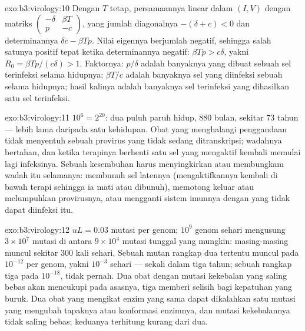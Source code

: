 \begin{solution}{exo:b3:virology:10}
Dengan $T$ tetap, persamaannya linear dalam $(I, V)$ dengan matriks
$\begin{pmatrix} -\delta & \beta T \\ p & -c \end{pmatrix}$, yang jumlah
diagonalnya $-(\delta + c) < 0$ dan determinannya $\delta c - \beta Tp$. Nilai
eigennya berjumlah negatif, sehingga salah satunya positif tepat ketika
determinannya negatif: $\beta Tp > c\delta$, yakni $R_{0} = \beta
Tp/(c\delta) > 1$. Faktornya: $p/\delta$ adalah banyaknya  yang dibuat
sebuah sel terinfeksi selama hidupnya; $\beta T/c$ adalah banyaknya sel yang
diinfeksi sebuah  selama hidupnya; hasil kalinya adalah banyaknya sel
terinfeksi yang dihasilkan satu sel terinfeksi.
\end{solution}

\begin{solution}{exo:b3:virology:11}
$10^{6} = 2^{20}$: dua puluh paruh hidup, $880$ bulan, sekitar $73$ tahun ---
lebih lama daripada satu kehidupan. Obat yang menghalangi penggandaan tidak
menyentuh sebuah provirus yang tidak sedang ditranskripsi; wadahnya bertahan,
dan ketika terapinya berhenti satu sel yang mengaktif kembali memulai lagi
infeksinya. Sebuah kesembuhan harus menyingkirkan atau membungkam wadah itu
selamanya: membunuh sel latennya (mengaktifkannya kembali di bawah terapi
sehingga ia mati atau dibunuh), memotong keluar atau melumpuhkan provirusnya,
atau mengganti sistem imunnya dengan yang tidak dapat diinfeksi  itu.
\end{solution}

\begin{solution}{exo:b3:virology:12}
$uL = 0.03$ mutasi per genom; $10^{9}$ genom sehari mengusung $3\times
10^{7}$ mutasi di antara $9\times 10^{4}$ mutasi tunggal yang mungkin:
masing-masing muncul sekitar $300$ kali sehari. Sebuah mutan rangkap dua
tertentu muncul pada $10^{-12}$ per genom, yakni $10^{-3}$ sehari --- sekali
dalam tiga tahun; sebuah rangkap tiga pada $10^{-18}$, tidak pernah. Dua obat
dengan mutasi kekebalan yang saling bebas akan mencukupi pada asasnya, tiga
memberi selisih bagi kepatuhan yang buruk. Dua obat yang mengikat enzim yang
sama dapat dikalahkan satu mutasi yang mengubah tapaknya atau konformasi
enzimnya, dan mutasi kekebalannya tidak saling bebas; keduanya terhitung
kurang dari dua.
\end{solution}

